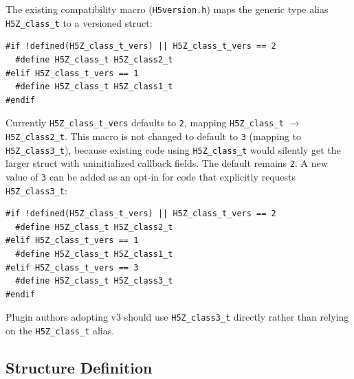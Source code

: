 \documentclass[../RFC-HDFG-2026-001.tex]{subfiles}
\begin{document}
The existing compatibility macro
(\texttt{H5version.h}) maps the generic type alias \texttt{H5Z\_class\_t} to a versioned
struct:

\begin{verbatim}
#if !defined(H5Z_class_t_vers) || H5Z_class_t_vers == 2
  #define H5Z_class_t H5Z_class2_t
#elif H5Z_class_t_vers == 1
  #define H5Z_class_t H5Z_class1_t
#endif
\end{verbatim}

Currently \texttt{H5Z\_class\_t\_vers} defaults to \texttt{2}, mapping
\texttt{H5Z\_class\_t} $\rightarrow$ \texttt{H5Z\_class2\_t}. This macro is not changed to default to
\texttt{3} (mapping to \texttt{H5Z\_class3\_t}), because existing code using \texttt{H5Z\_class\_t}
would silently get the larger struct with uninitialized callback fields. The
default remains \texttt{2}. A new value of \texttt{3} can be added as an opt-in for
code that explicitly requests \texttt{H5Z\_class3\_t}:

\begin{verbatim}
#if !defined(H5Z_class_t_vers) || H5Z_class_t_vers == 2
  #define H5Z_class_t H5Z_class2_t
#elif H5Z_class_t_vers == 1
  #define H5Z_class_t H5Z_class1_t
#elif H5Z_class_t_vers == 3
  #define H5Z_class_t H5Z_class3_t
#endif
\end{verbatim}

Plugin authors adopting v3 should use \texttt{H5Z\_class3\_t} directly rather than
relying on the \texttt{H5Z\_class\_t} alias.


\subsection{Structure Definition}
\label{sec:class3-struct}
\end{document}
